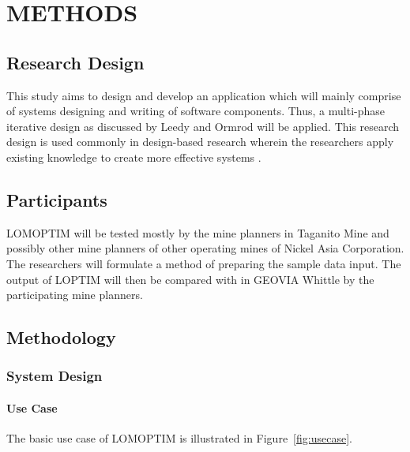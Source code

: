 \documentclass[12pt]{report}
\begin{document}
\chapter{METHODS}

\section{Research Design}

This study aims to design and develop an application which will mainly comprise of systems designing and writing of software components.
Thus, a multi-phase iterative design as discussed by Leedy and Ormrod will be applied.
This research design is used commonly in design-based research wherein the researchers apply existing knowledge to create more effective systems \cite{MixedMethod}.

\section{Participants}

LOMOPTIM will be tested mostly by the mine planners in Taganito Mine and possibly other mine planners of other operating mines of Nickel Asia Corporation.
The researchers will formulate a method of preparing the sample data input.
The output of LOPTIM will then be compared with in GEOVIA Whittle by the participating mine planners.

\section{Methodology}

\subsection{System Design}

\subsubsection{Use Case}

The basic use case \cite{usecase} of LOMOPTIM is illustrated in Figure~\ref{fig:usecase}.
\end{document}
